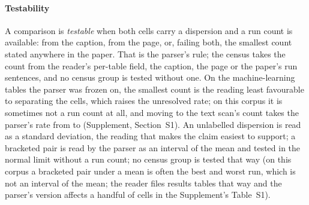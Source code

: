 \documentclass[preprint,review,12pt]{elsarticle}
\begin{document}
\paragraph{Testability} A comparison is \emph{testable} when both cells carry a dispersion and a run count is available: from the caption, from the page, or, failing both, the smallest count stated anywhere in the paper. That is the parser's rule; the census takes the count from the reader's per-table field, the caption, the page or the paper's run sentences, and no census group is tested without one. On the machine-learning tables the parser was frozen on, the smallest count is the reading least favourable to separating the cells, which raises the unresolved rate; on this corpus it is sometimes not a run count at all, and moving to the text scan's count takes the parser's rate from \nPrAsReportedFail{} to \nPrAsReportedScanFail{} (Supplement, Section~S1). An unlabelled dispersion is read as a standard deviation, the reading that makes the claim easiest to support; a bracketed pair is read by the parser as an interval of the mean and tested in the normal limit without a run count; no census group is tested that way (on this corpus a bracketed pair under a mean is often the best and worst run, which is not an interval of the mean; the reader files \nCrcFormBracket{} results tables that way and the parser's version affects a handful of cells in the Supplement's Table~S1).
\end{document}

